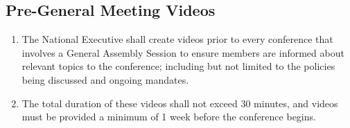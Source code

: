 \subsection{Pre-General Meeting Videos}
\label{pre-general-meeting-videos}

\begin{enumerate}
 \item
  The National Executive shall create videos prior to every conference that involves a General Assembly Session to ensure members are informed about relevant topics to the conference; including but not limited to the policies being discussed and ongoing mandates.
 \item
  The total duration of these videos shall not exceed 30 minutes, and videos must be provided a minimum of 1 week before the conference begins.
\end{enumerate}
